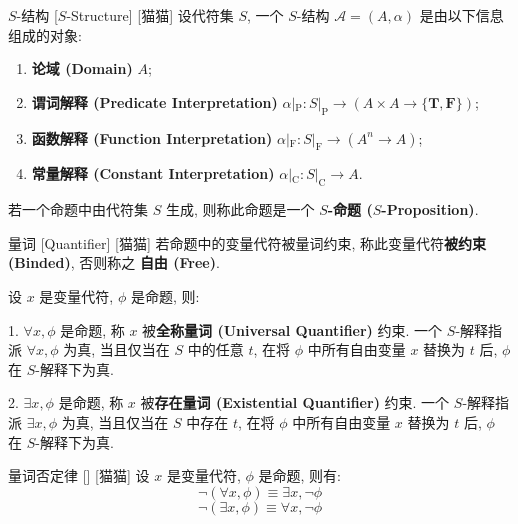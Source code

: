 \documentclass[UTF8]{ctexart}
\newcommand{\LT}{\ensuremath{\mathbf{T}}}
\newcommand{\LF}{\ensuremath{\mathbf{F}}}
\begin{document}
            \begin{dfn}
                []
                {\(S\)-结构}
                [\(S\)-Structure]
                [猫猫]
                设代符集 \(S\), 一个 \(S\)-结构 \(\mathcal{A}=(A,\alpha)\) 是由以下信息组成的对象: 
                \begin{enumerate}
                    \item \textbf{论域 (Domain)} \(A\); 
                    \item \textbf{谓词解释 (Predicate Interpretation)} \(\alpha|_\text{P} : S|_\text{P}\to (A\times A\to\{\LT, \LF\})\); 
                    \item \textbf{函数解释 (Function Interpretation)} \(\alpha|_\text{F} : S|_\text{F}\to (A^n\to A)\); 
                    \item \textbf{常量解释 (Constant Interpretation)} \(\alpha|_\text{C} : S|_\text{C}\to A\). 
                \end{enumerate}

                若一个命题中由代符集 \(S\) 生成, 则称此命题是一个 \textbf{\(S\)-命题 (\(S\)-Proposition)}. 
            \end{dfn}

            \begin{dfn}
                []
                {量词}
                [Quantifier]
                [猫猫]
                若命题中的变量代符被量词约束, 称此变量代符\textbf{被约束 (Binded)}, 否则称之 \textbf{自由 (Free)}. 

                设 \(x\) 是变量代符, \(\phi\) 是命题, 则: 

                1. \(\forall x, \phi\) 是命题, 称 \(x\) 被\textbf{全称量词 (Universal Quantifier)} 约束. 一个 \(S\)-解释指派 \(\forall x, \phi\) 为真, 当且仅当在 \(S\) 中的任意 \(t\), 在将 \(\phi\) 中所有自由变量 \(x\) 替换为 \(t\) 后, \(\phi\) 在 \(S\)-解释下为真. 

                2. \(\exists x, \phi\) 是命题, 称 \(x\) 被\textbf{存在量词 (Existential Quantifier)} 约束. 一个 \(S\)-解释指派 \(\exists x, \phi\) 为真, 当且仅当在 \(S\) 中存在 \(t\), 在将 \(\phi\) 中所有自由变量 \(x\) 替换为 \(t\) 后, \(\phi\) 在 \(S\)-解释下为真. 
            \end{dfn}

            \begin{ppt}
                []
                {量词否定律}
                []
                [猫猫]
                设 \(x\) 是变量代符, \(\phi\) 是命题, 则有: 
                \[\neg(\forall x, \phi)\equiv\exists x, \neg\phi\]
                \[\neg(\exists x, \phi)\equiv\forall x, \neg\phi\]
            \end{ppt}
\end{document}
